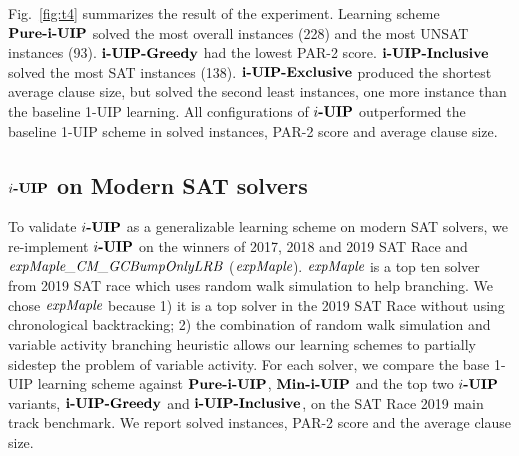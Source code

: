 \documentclass[runningheads]{llncs}
\begin{document}
Fig.~\ref{fig:t4} summarizes the result of the experiment. Learning
scheme $\textbf{Pure-i-UIP}$ solved the most overall instances (228) and the
most UNSAT instances (93). $\textbf{i-UIP-Greedy}$ had the lowest PAR-2
score. $\textbf{i-UIP-Inclusive}$ solved the most SAT instances (138). $\textbf{i-UIP-Exclusive}$
produced the shortest average clause size, but solved the second least
instances, one more instance than the baseline 1-UIP learning. All
configurations of $\textbf{$i$-UIP}$ outperformed the baseline 1-UIP scheme in
solved instances, PAR-2 score and average clause size.


\subsection{$\textbf{$i$-UIP}$ on Modern SAT solvers}
To validate $\textbf{$i$-UIP}$ as a generalizable learning scheme on modern SAT
solvers, we re-implement $\textbf{$i$-UIP}$ on the winners of 2017, 2018 and 2019
SAT Race\cite{} and $\textit{expMaple\_CM\_GCBumpOnlyLRB}$\cite{} ($\textit{expMaple}$). $\textit{expMaple}$
is a top ten solver from 2019 SAT race which uses random walk
simulation to help branching. We chose $\textit{expMaple}$ because 1) it is
a top solver in the 2019 SAT Race without using chronological
backtracking; 2) the combination of random walk simulation and
variable activity branching heuristic allows our learning schemes to
partially sidestep the problem of variable activity. For each solver,
we compare the base 1-UIP learning scheme against $\textbf{Pure-i-UIP}$,
$\textbf{Min-i-UIP}$ and the top two $\textbf{$i$-UIP}$ variants, $\textbf{i-UIP-Greedy}$ and
$\textbf{i-UIP-Inclusive}$, on the SAT Race 2019 main track benchmark. We report
solved instances, PAR-2 score and the average clause size.
\end{document}
